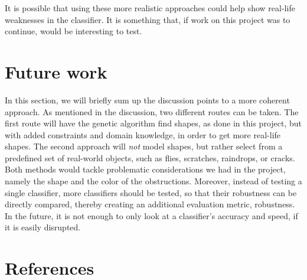 \documentclass[conference]{IEEEtran}
\begin{document}
It is possible that using these more realistic approaches could help show real-life weaknesses in the classifier.
It is something that, if work on this project was to continue, would be interesting to test.  

\section{Future work}
In this section, we will briefly sum up the discussion points to a more coherent approach.
As mentioned in the discussion, two different routes can be taken.
The first route will have the genetic algorithm find shapes, as done in this project, but with added constraints and domain knowledge, in order to get more real-life shapes.
The second approach will \textit{not} model shapes, but rather select from a predefined set of real-world objects, such as flies, scratches, raindrops, or cracks.
Both methods would tackle problematic considerations we had in the project, namely the shape and the color of the obstructions.
Moreover, instead of testing a single classifier, more classifiers should be tested, so that their robustness can be directly compared, thereby creating an additional evaluation metric, robustness.
In the future, it is not enough to only look at a classifier's accuracy and speed, if it is easily disrupted.

\section{References}
\printbibliography[heading=none]
\end{document}
